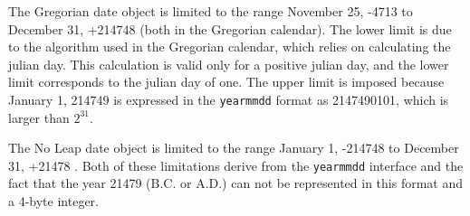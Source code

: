 
The Gregorian date object is limited to the range
November 25, -4713 to December 31, +214748 (both in the Gregorian calendar).  The lower limit
is due to the algorithm used in the Gregorian calendar, which relies on
calculating the julian day.  This calculation is valid only for a positive
julian day, and the lower limit corresponds to the julian day of one.  The
upper limit is imposed because January 1, 214749 is expressed in the {\tt yearmmdd}
format as 2147490101, which is larger than \( 2^{31} \).

The No Leap date object is limited to the range January 1, -214748 to
December 31, +21478 .  Both of these limitations derive from the {\tt yearmmdd}
interface and the fact that the year 21479 (B.C. or A.D.) can not be represented
in this format and a 4-byte integer.



